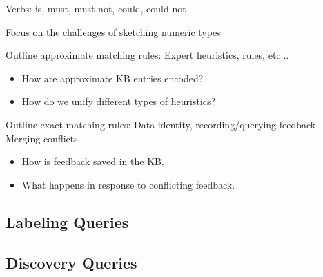 Verbs: is, must, must-not, could, could-not


Focus on the challenges of sketching numeric types

Outline approximate matching rules: Expert heuristics, rules, etc...
\begin{itemize}
  \item How are approximate KB entries encoded?
  \item How do we unify different types of heuristics?
\end{itemize}



Outline exact matching rules: Data identity, recording/querying feedback.  Merging conflicts.

\begin{itemize}
  \item How is feedback saved in the KB.
  \item What happens in response to conflicting feedback.  
\end{itemize}



\subsection{Labeling Queries}

\subsection{Discovery Queries}

